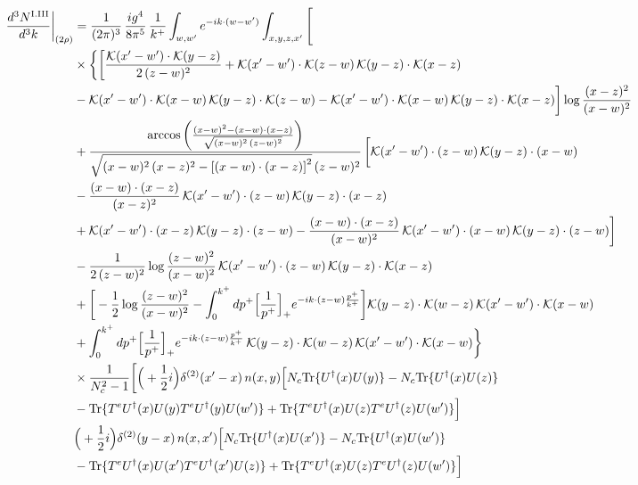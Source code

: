 \documentclass[9pt]{article}
\numberwithin{equation}{section}
\begin{document}
\begin{align}
\frac{d^{3}N^{\rm I.III}}{d^{3}k}\bigg|_{(2\rho)}&=\frac{1}{(2\pi)^{3}}\,\frac{ig^{4}}{8\pi^{5}}\,\frac{1}{k^{+}}\int_{w,w'}e^{-ik\cdot(w-w')}\int_{x,y,z,x'}\Bigg[\notag\\
&\times\bigg\{\bigg[\frac{\mathcal{K}(x'-w')\cdot\mathcal{K}(y-z)}{2\,(z-w)^{2}}+\mathcal{K}(x'-w')\cdot\mathcal{K}(z-w)\,\mathcal{K}(y-z)\cdot\mathcal{K}(x-z)\notag\\
&-\mathcal{K}(x'-w')\cdot\mathcal{K}(x-w)\,\mathcal{K}(y-z)\cdot\mathcal{K}(z-w)-\mathcal{K}(x'-w')\cdot\mathcal{K}(x-w)\,\mathcal{K}(y-z)\cdot\mathcal{K}(x-z)\bigg]\log\frac{(x-z)^{2}}{(x-w)^{2}}\notag\\
&+\frac{\arccos\left(\frac{(x-w)^{2}-(x-w)\cdot (x-z)}{\sqrt{(x-w)^{2}\,(z-w)^{2}}}\right)}{\sqrt{(x-w)^{2}\,(x-z)^{2}-\left[(x-w)\cdot (x-z)\right]^{2}}\,(z-w)^{2}}\,\bigg[\mathcal{K}(x'-w')\cdot(z-w)\,\mathcal{K}(y-z)\cdot(x-w)\notag\\
&-\frac{(x-w)\cdot(x-z)}{(x-z)^{2}}\,\mathcal{K}(x'-w')\cdot(z-w)\,\mathcal{K}(y-z)\cdot(x-z)\notag\\
&+\mathcal{K}(x'-w')\cdot(x-z)\,\mathcal{K}(y-z)\cdot(z-w)-\frac{(x-w)\cdot(x-z)}{(x-w)^{2}}\,\mathcal{K}(x'-w')\cdot(x-w)\,\mathcal{K}(y-z)\cdot(z-w)\bigg]\notag\\
&-\frac{1}{2\,(z-w)^{2}}\log\frac{(z-w)^{2}}{(x-w)^{2}}\,\mathcal{K}(x'-w')\cdot(z-w)\,\mathcal{K}(y-z)\cdot\mathcal{K}(x-z)\notag\\
&+\bigg[-\frac{1}{2}\log\frac{(z-w)^{2}}{(x-w)^{2}}-\int_{0}^{k^{+}}dp^{+}\Big[\frac{1}{p^{+}}\Big]_{+}e^{-ik\cdot(z-w)\frac{p^{+}}{k^{+}}}\bigg]\mathcal{K}(y-z)\cdot\mathcal{K}(w-z)\,\mathcal{K}(x'-w')\cdot\mathcal{K}(x-w)\notag\\
&+\int_{0}^{k^{+}}dp^{+}\Big[\frac{1}{p^{+}}\Big]_{+}e^{-ik\cdot(z-w)\frac{p^{+}}{k^{+}}}\,\mathcal{K}(y-z)\cdot\mathcal{K}(w-z)\,\mathcal{K}(x'-w')\cdot\mathcal{K}(x-w)\bigg\}\notag\\
&\times \frac{1}{N_{c}^{2}-1}\bigg[\Big(+\frac{1}{2}i\Big)\delta^{(2)}(x'-x)\,n(x,y)\Big[N_{c}{\rm Tr}\{U^{\dagger}(x)U(y)\}-N_{c}{\rm Tr}\{U^{\dagger}(x)U(z)\}\notag\\
& -{\rm Tr}\{T^{e}U^{\dagger}(x)U(y)T^{e}U^{\dagger}(y)U(w')\}+{\rm Tr}\{T^{e}U^{\dagger}(x)U(z)T^{e}U^{\dagger}(z)U(w')\}\Big]\notag\\
& \Big(+\frac{1}{2}i\Big)\delta^{(2)}(y-x)\,n(x,x')\Big[N_{c}{\rm Tr}\{U^{\dagger}(x)U(x')\}-N_{c}{\rm Tr}\{U^{\dagger}(x)U(w')\}\notag\\
& -{\rm Tr}\{T^{e}U^{\dagger}(x)U(x')T^{e}U^{\dagger}(x')U(z)\}+{\rm Tr}\{T^{e}U^{\dagger}(x)U(z)T^{e}U^{\dagger}(z)U(w')\}\Big]\notag\\

\end{align}
\end{document}
